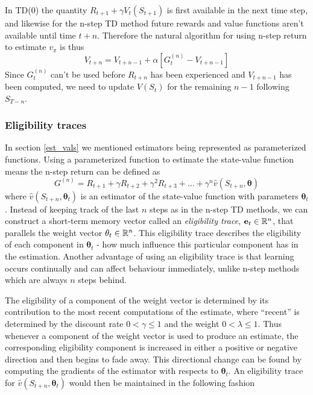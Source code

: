 \documentclass[11pt]{article}
\begin{document}
In TD($0$) the quantity $R_{t+1} + \gamma  V_t(S_{t+1})$ is
first available in the next time step, and likewise for the n-step TD method future rewards
and value functions aren't available until time $t + n$.
Therefore the natural algorithm for using n-step return to estimate $v_\pi$ is thus
\begin{equation}
    V_{t+n} = V_{t+n-1} + \alpha  [G^{(n)}_t - V_{t+n-1}]
\end{equation}
Since $G^{(n)}_t$ can't be used before $R_{t+n}$ has been experienced
and $V_{t+n-1}$ has been computed, we need to update
$V(S_t)$ for the remaining $n - 1$ following $S_{T-n}$.

\subsubsection{Eligibility traces}\label{sec:eligibility_traces}

In section \ref{est_vals} we mentioned estimators being represented as
parameterized functions.
Using a parameterized function to estimate the state-value function means
the n-step return can be defined as
\begin{equation}
    G^{(n)} = R_{t+1} + \gamma  R_{t+2} + \gamma^2  R_{t+3} + \dots + \gamma^n  \hat{v}(S_{t+n}, \mathbf{\theta})
\end{equation}
where $\hat{v}(S_{t+n}, \mathbf{\theta}_t)$ is an estimator of the
state-value function with parameters $\mathbf{\theta}_t$.
Instead of keeping track of the last $n$ steps as in the n-step TD
methods,
we can construct a short-term memory vector called an \textit{eligibility trace}, $\mathbf{e}_t \in \mathbb{R}^n$,
that parallels the weight vector $\mathbf{\theta}_t \in \mathbb{R}^n$\cite{RLbook}.
This eligibility trace describes the eligibility of each component in $\mathbf{\theta}_t$ -
how much influence this particular component has in the estimation.
Another advantage of using an eligibility trace is that
learning occurs continually and can affect behaviour immediately,
unlike n-step methods which are always $n$ steps behind.

The eligibility of a component of the weight vector is determined
by its contribution to the most recent computations of the estimate,
where “recent” is determined by the discount rate $0 < \gamma \leq 1$ and the weight
$0 < \lambda \leq 1$.
Thus whenever a component of the weight vector
is used to produce an estimate, the corresponding eligibility component
is increased in either a positive or negative direction and then begins to fade away.
This directional change can be found by computing the
gradients of the estimator with respects to $\mathbf{\theta}_t$\cite{RLbook}.
An eligibility trace for $\hat{v}(S_{t+n}, \mathbf{\theta}_t)$ would then
be maintained in the following fashion
\end{document}
